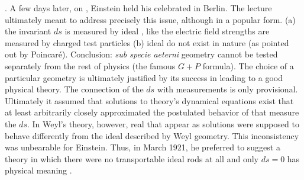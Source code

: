 \documentclass[final]{article}
\newcommand{\WT}{Weyl's theory\xspace}
\newcommand{\WG}{Weyl geometry\xspace}
\begin{document}
{. A few days later, on , Einstein held his celebrated  in Berlin. The lecture ultimately meant to address precisely this issue, although in a popular form. (a) the invariant $ds$ is measured by ideal \rac, like the electric field strengths are measured by charged test particles (b) ideal \rac do not exist in nature (as pointed out by Poincaré). Conclusion: \emph{sub specie aeterni} geometry cannot be tested separately from the rest of physics (the famous $G+P$ formula). The choice of a particular geometry is ultimately justified by its success in leading to a good physical theory. The connection of the $ds$ with \rach measurements is only provisional. Ultimately it assumed that solutions to theory's dynamical equations exist that at least arbitrarily closely approximated the postulated behavior of \rac that measure the $ds$. In \WT, however, real \rac that appear as solutions were supposed to behave differently from the ideal \rac described by \WG. This inconsistency was unbearable for Einstein. Thus, in March 1921, he preferred to suggest a theory in which there were no transportable ideal rods at all and only $ds=0$ has physical meaning \citep{Einstein1921c}}.
\end{document}
